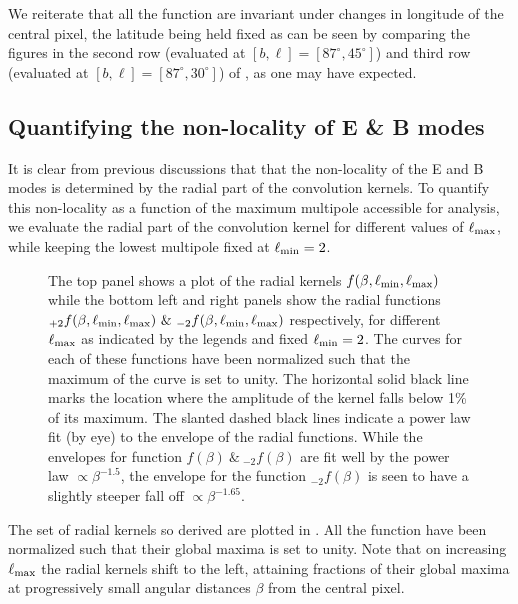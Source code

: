 We reiterate that all the function are invariant under changes in longitude of the central pixel, the latitude being held fixed as can be seen by comparing the figures in the second row (evaluated at $[b,\ell]=[87^{\circ},45^{\circ}]$) and third row (evaluated at $[b,\ell]=[87^{\circ},30^{\circ}]$) of , as one may have expected.

\subsection{Quantifying the non-locality of E \& B modes} \label{sec:radial_locality}
It is clear from previous discussions that that the non-locality of the E and B modes is determined by the radial part of the convolution kernels. To quantify this non-locality as a function of the maximum multipole accessible for analysis, we evaluate the radial part of the convolution kernel for different values of $\ell_{\rm max}$, while keeping the lowest multipole fixed at $\ell_{\rm min}=2$. 
%
\begin{figure}[t]
\centering
{}
\caption{The top panel shows a plot of the radial kernels $f(\beta,\ell_{\rm min},\ell_{\rm max})$ while the bottom left and right panels show the radial functions ${}_{+2}f(\beta,\ell_{\rm min},\ell_{\rm max}) ~\&~ {}_{-2}f(\beta,\ell_{\rm min},\ell_{\rm max})$ respectively, for different $\ell_{\rm max}$ as indicated by the legends and fixed $\ell_{\rm min}=2$. The curves for each of these functions have been normalized such that the maximum of the curve is set to unity. The horizontal solid black line marks the location where the amplitude of the kernel falls below 1\% of its maximum. The slanted dashed black lines indicate a power law fit (by eye) to the envelope of the radial functions. While the envelopes for function $f(\beta)~\&~ {}_{-2}f(\beta)$ are fit well by the power law $\propto \beta^{-1.5}$, the envelope for the function ${}_{-2}f(\beta)$ is seen to have a slightly steeper fall off $\propto \beta^{-1.65}$.}
\label{fig:rad_ker_decay}
\end{figure}
%
The set of radial kernels so derived are plotted in . All the function have been normalized such that their global maxima is set to unity. Note that on increasing $\ell_{\rm max}$ the radial kernels shift to the left, attaining fractions of  their global maxima at progressively small angular distances $\beta$ from the central pixel.  

